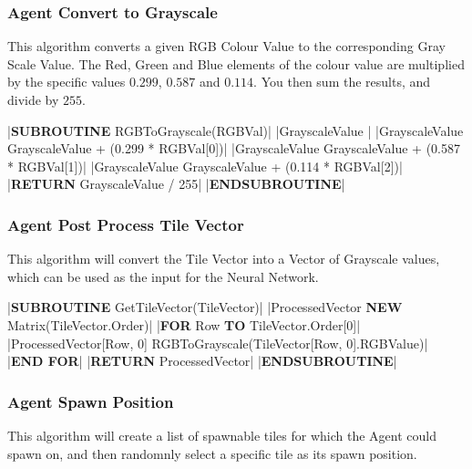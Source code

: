 \begin{flushleft}
                \vspace{0.5cm}
            \subsubsection{Agent Convert to Grayscale}
                This algorithm converts a given RGB Colour Value to the corresponding Gray Scale Value. The Red, Green and Blue elements of
                the colour value are multiplied by the specific values $0.299$, $0.587$ and $0.114$. You then sum the results, and divide by 
                $255$.

                \vspace{0.2cm}
                \begin{pseudocode}
|\textbf{SUBROUTINE} RGBToGrayscale(RGBVal)|
    |GrayscaleValue |
    |GrayscaleValue \leftarrow GrayscaleValue + (0.299 * RGBVal[0])|
    |GrayscaleValue \leftarrow GrayscaleValue + (0.587 * RGBVal[1])|
    |GrayscaleValue \leftarrow GrayscaleValue + (0.114 * RGBVal[2])|
    |\textbf{RETURN} GrayscaleValue / 255|
|\textbf{ENDSUBROUTINE}|
                \end{pseudocode}

                \vspace{0.5cm}
            \subsubsection{Agent Post Process Tile Vector}
                This algorithm will convert the Tile Vector into a Vector of Grayscale values, which can be used as the input for the Neural
                Network.

                \vspace{0.2cm}
                \begin{pseudocode}
|\textbf{SUBROUTINE} GetTileVector(TileVector)|
    |ProcessedVector \leftarrow \textbf{NEW} Matrix(TileVector.Order)|
    |\textbf{FOR} Row  \textbf{TO} TileVector.Order[0]|
        |ProcessedVector[Row, 0] \leftarrow RGBToGrayscale(TileVector[Row, 0].RGBValue)|
    |\textbf{END FOR}|
    |\textbf{RETURN} ProcessedVector|
|\textbf{ENDSUBROUTINE}|
                \end{pseudocode}
                
                \vspace{0.5cm}
            \subsubsection{Agent Spawn Position}
                This algorithm will create a list of spawnable tiles for which the Agent could spawn on, and then randomnly select a specific
                tile as its spawn position.


\end{flushleft}
